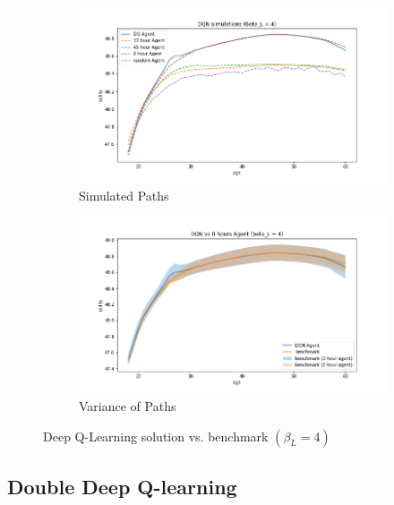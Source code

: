\begin{figure}[ht]
\begin{subfigure}{.5\textwidth}
  \centering
  \includegraphics[width=1\linewidth]{figures/dqn_model1_beta_4_solution_benchmark_paths.png}
  \caption{Simulated Paths}
  \label{fig:dqn_solution_beta4_path}
\end{subfigure}%
\begin{subfigure}{.5\textwidth}
  \centering
  \includegraphics[width=1\linewidth]{figures/dqn_model1_beta_4_solution_benchmark_variance.png}
  \caption{Variance of Paths}
  \label{fig:dqn_solution_beta4_var}
\end{subfigure}
    \caption{Deep Q-Learning solution vs. benchmark $(\beta_L = 4)$}
    \label{fig:dqn_solution_beta4}
\end{figure}


\subsection{Double Deep Q-learning}

